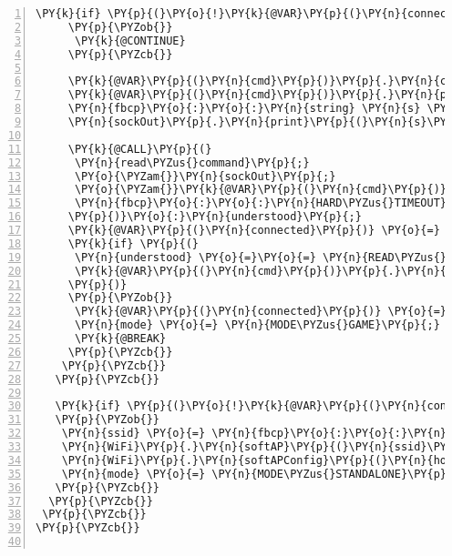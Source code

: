 \begin{Verbatim}[commandchars=\\\{\},numbers=left,firstnumber=1,stepnumber=1,frame=leftline,numbersep=0pt]
     \PY{k}{if} \PY{p}{(}\PY{o}{!}\PY{k}{@VAR}\PY{p}{(}\PY{n}{connected}\PY{p}{)}\PY{p}{)}
     \PY{p}{\PYZob{}}
      \PY{k}{@CONTINUE}
     \PY{p}{\PYZcb{}}

     \PY{k}{@VAR}\PY{p}{(}\PY{n}{cmd}\PY{p}{)}\PY{p}{.}\PY{n}{command} \PY{o}{=} \PY{o}{\PYZam{}}\PY{n}{fbcp}\PY{o}{:}\PY{o}{:}\PY{n}{Q\PYZus{}SINGLE\PYZus{}PRESENTATION}\PY{p}{;}
     \PY{k}{@VAR}\PY{p}{(}\PY{n}{cmd}\PY{p}{)}\PY{p}{.}\PY{n}{params}\PY{p}{[}\PY{l+s}{\PYZdq{}}\PY{l+s}{serial}\PY{l+s}{\PYZdq{}}\PY{p}{]} \PY{o}{=} \PY{n}{fbcp}\PY{o}{:}\PY{o}{:}\PY{n}{serial}\PY{p}{;}
     \PY{n}{fbcp}\PY{o}{:}\PY{o}{:}\PY{n}{string} \PY{n}{s} \PY{o}{=} \PY{n}{fbcp}\PY{o}{:}\PY{o}{:}\PY{n}{writeCommand}\PY{p}{(}\PY{k}{@VAR}\PY{p}{(}\PY{n}{cmd}\PY{p}{)}\PY{p}{)}\PY{p}{;}
     \PY{n}{sockOut}\PY{p}{.}\PY{n}{print}\PY{p}{(}\PY{n}{s}\PY{p}{.}\PY{n}{c\PYZus{}str}\PY{p}{(}\PY{p}{)}\PY{p}{)}\PY{p}{;}
     
     \PY{k}{@CALL}\PY{p}{(}
      \PY{n}{read\PYZus{}command}\PY{p}{;}
      \PY{o}{\PYZam{}}\PY{n}{sockOut}\PY{p}{;}
      \PY{o}{\PYZam{}}\PY{k}{@VAR}\PY{p}{(}\PY{n}{cmd}\PY{p}{)}\PY{p}{;}
      \PY{n}{fbcp}\PY{o}{:}\PY{o}{:}\PY{n}{HARD\PYZus{}TIMEOUT}
     \PY{p}{)}\PY{o}{:}\PY{n}{understood}\PY{p}{;}
     \PY{k}{@VAR}\PY{p}{(}\PY{n}{connected}\PY{p}{)} \PY{o}{=} \PY{n+nb}{false}\PY{p}{;}
     \PY{k}{if} \PY{p}{(}
      \PY{n}{understood} \PY{o}{=}\PY{o}{=} \PY{n}{READ\PYZus{}SUCCESS} \PY{o}{\PYZam{}}\PY{o}{\PYZam{}}
      \PY{k}{@VAR}\PY{p}{(}\PY{n}{cmd}\PY{p}{)}\PY{p}{.}\PY{n}{command}\PY{o}{\PYZhy{}}\PY{o}{\PYZgt{}}\PY{n}{code} \PY{o}{=}\PY{o}{=} \PY{n}{fbcp}\PY{o}{:}\PY{o}{:}\PY{n}{A\PYZus{}GRANT\PYZus{}ACCESS}\PY{p}{.}\PY{n}{code}
     \PY{p}{)}
     \PY{p}{\PYZob{}}
      \PY{k}{@VAR}\PY{p}{(}\PY{n}{connected}\PY{p}{)} \PY{o}{=} \PY{n+nb}{true}\PY{p}{;}
      \PY{n}{mode} \PY{o}{=} \PY{n}{MODE\PYZus{}GAME}\PY{p}{;}
      \PY{k}{@BREAK}
     \PY{p}{\PYZcb{}}
    \PY{p}{\PYZcb{}}
   \PY{p}{\PYZcb{}}

   \PY{k}{if} \PY{p}{(}\PY{o}{!}\PY{k}{@VAR}\PY{p}{(}\PY{n}{connected}\PY{p}{)}\PY{p}{)}
   \PY{p}{\PYZob{}}
    \PY{n}{ssid} \PY{o}{=} \PY{n}{fbcp}\PY{o}{:}\PY{o}{:}\PY{n}{serial}\PY{p}{;}
    \PY{n}{WiFi}\PY{p}{.}\PY{n}{softAP}\PY{p}{(}\PY{n}{ssid}\PY{p}{.}\PY{n}{c\PYZus{}str}\PY{p}{(}\PY{p}{)}\PY{p}{)}\PY{p}{;}
    \PY{n}{WiFi}\PY{p}{.}\PY{n}{softAPConfig}\PY{p}{(}\PY{n}{host}\PY{p}{,} \PY{n}{gateway}\PY{p}{,} \PY{n}{submask}\PY{p}{)}\PY{p}{;}
    \PY{n}{mode} \PY{o}{=} \PY{n}{MODE\PYZus{}STANDALONE}\PY{p}{;}
   \PY{p}{\PYZcb{}}
  \PY{p}{\PYZcb{}}
 \PY{p}{\PYZcb{}}
\PY{p}{\PYZcb{}}


\end{Verbatim}
